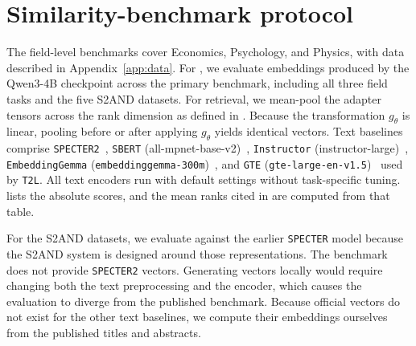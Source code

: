 \section{Similarity-benchmark protocol}
\label{app:benchmarks}

The field-level benchmarks cover Economics, Psychology, and Physics, with data described in Appendix~\ref{app:data}.
For \doctolora, we evaluate embeddings produced by the Qwen3-4B checkpoint across the primary benchmark, including all three field tasks and the five S2AND datasets.
For retrieval, we mean-pool the adapter tensors across the rank dimension as defined in .
Because the transformation $g_\theta$ is linear, pooling before or after applying $g_\theta$ yields identical vectors.
Text baselines comprise \texttt{SPECTER2}~\citep{singh2023scirepeval}, \texttt{SBERT} (all-mpnet-base-v2)~\citep{reimers2019sbert}, \texttt{Instructor} (instructor-large)~\citep{su2023instructor}, \texttt{EmbeddingGemma} (\texttt{embeddinggemma-300m})~\citep{embeddinggemma2025}, and \texttt{GTE} (\texttt{gte-large-en-v1.5})~\citep{li2023gte} used by \texttt{T2L}.
All text encoders run with default settings without task-specific tuning.
 lists the absolute scores, and the mean ranks cited in  are computed from that table.

For the S2AND datasets, we evaluate against the earlier \texttt{SPECTER} model because the S2AND system is designed around those representations.
The benchmark does not provide \texttt{SPECTER2} vectors.
Generating vectors locally would require changing both the text preprocessing and the encoder, which causes the evaluation to diverge from the published benchmark.
Because official vectors do not exist for the other text baselines, we compute their embeddings ourselves from the published titles and abstracts.

